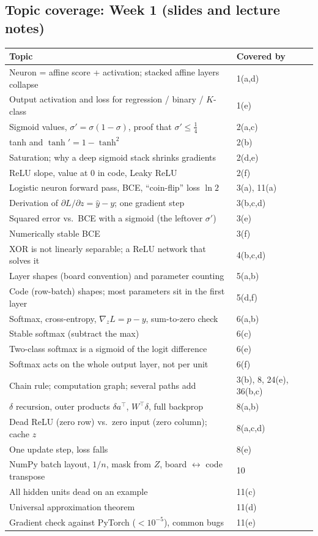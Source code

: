 \documentclass[12pt,a4paper]{article}
\begin{document}
\subsection*{Topic coverage: Week 1 (slides and lecture notes)}
\begin{center}
\begin{tabular}{@{}>{\raggedright\arraybackslash}p{}l@{}}
\toprule
Topic & Covered by\\
\midrule
Neuron = affine score + activation; stacked affine layers collapse & 1(a,d)\\
Output activation and loss for regression / binary / $K$-class & 1(e)\\
Sigmoid values, $\sigma'=\sigma(1-\sigma)$, proof that $\sigma'\le\tfrac14$ & 2(a,c)\\
tanh and $\tanh'=1-\tanh^2$ & 2(b)\\
Saturation; why a deep sigmoid stack shrinks gradients & 2(d,e)\\
ReLU slope, value at 0 in code, Leaky ReLU & 2(f)\\
Logistic neuron forward pass, BCE, ``coin-flip'' loss $\ln2$ & 3(a), 11(a)\\
Derivation of $\partial L/\partial z=\hat y-y$; one gradient step & 3(b,c,d)\\
Squared error vs.\ BCE with a sigmoid (the leftover $\sigma'$) & 3(e)\\
Numerically stable BCE & 3(f)\\
XOR is not linearly separable; a ReLU network that solves it & 4(b,c,d)\\
Layer shapes (board convention) and parameter counting & 5(a,b)\\
Code (row-batch) shapes; most parameters sit in the first layer & 5(d,f)\\
Softmax, cross-entropy, $\nabla_zL=p-y$, sum-to-zero check & 6(a,b)\\
Stable softmax (subtract the max) & 6(c)\\
Two-class softmax is a sigmoid of the logit difference & 6(e)\\
Softmax acts on the whole output layer, not per unit & 6(f)\\
Chain rule; computation graph; several paths add & 3(b), 8, 24(e), 36(b,c)\\
$\delta$ recursion, outer products $\delta a^\top$, $W^\top\delta$, full backprop & 8(a,b)\\
Dead ReLU (zero row) vs.\ zero input (zero column); cache $z$ & 8(a,c,d)\\
One update step, loss falls & 8(e)\\
NumPy batch layout, $1/n$, mask from $Z$, board $\leftrightarrow$ code transpose & 10\\
All hidden units dead on an example & 11(c)\\
Universal approximation theorem & 11(d)\\
Gradient check against PyTorch ($<10^{-5}$), common bugs & 11(e)\\
\bottomrule
\end{tabular}
\end{center}
\end{document}
